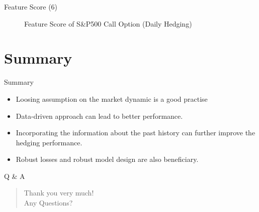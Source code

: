 \documentclass[10pt,table,mathserif]{beamer}
\begin{document}
\begin{frame}[fragile]{Feature Score (6)}
\begin{figure}[htp]
  \centering
  \caption{Feature Score of S\&P500 Call Option (Daily Hedging)} \label{fig:call1}
\end{figure}
\end{frame}

\section{Summary}
\begin{frame}[fragile]{Summary}
\begin{itemize}
  \item Loosing assumption on the market dynamic is a good practise
  \item Data-driven approach can lead to better performance.
  \item Incorporating the information about the past history can further improve the hedging performance.
  \item Robust losses and robust model design are also beneficiary. 
\end{itemize}
\end{frame}

\begin{frame}{Q \& A}
  \LARGE
  \begin{quote}
    \alert{Thank you very much!}\\
    \hspace{8ex} Any Questions?
  \end{quote}
\end{frame}
\end{document}
